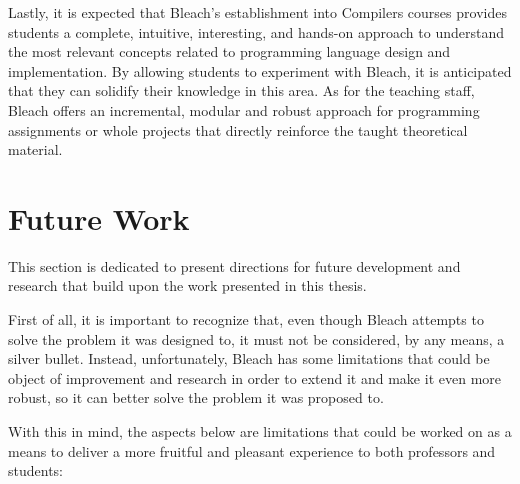 Lastly, it is expected that Bleach's establishment into Compilers courses provides students a complete, intuitive, interesting, and hands-on approach to understand the most relevant concepts related to programming language design and implementation. By allowing students to experiment with Bleach, it is anticipated that they can solidify their knowledge in this area. As for the teaching staff, Bleach offers an incremental, modular and robust approach for programming assignments or whole projects that directly reinforce the taught theoretical material.

\section{Future Work}
This section is dedicated to present directions for future development and research that build upon the work presented in this thesis.

First of all, it is important to recognize that, even though Bleach attempts to solve the problem it was designed to, it must not be considered, by any means, a silver bullet. Instead, unfortunately, Bleach has some limitations that could be object of improvement and research in order to extend it and make it even more robust, so it can better solve the problem it was proposed to.

With this in mind, the aspects below are limitations that could be worked on as a means to deliver a more fruitful and pleasant experience to both professors and students:

